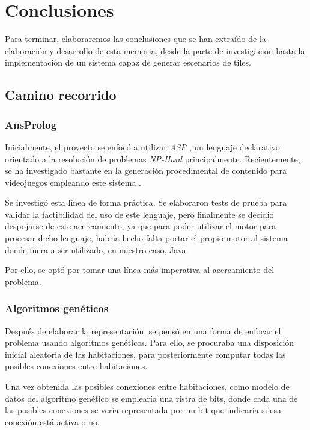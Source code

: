 \chapter{Conclusiones}\label{cap:capitulo9}

Para terminar, elaboraremos las conclusiones que se han extraído de la elaboración y desarrollo de esta memoria, desde la parte de investigación hasta la implementación de un sistema capaz de generar escenarios de tiles.

\section{Camino recorrido}

\subsection{AnsProlog}

Inicialmente, el proyecto se enfocó a utilizar \emph{ASP} \cite{ansprolog}, un lenguaje declarativo orientado a la resolución de problemas \emph{NP-Hard} \cite{nphard} principalmente. Recientemente, se ha investigado bastante en la generación procedimental de contenido para videojuegos empleando este sistema \cite{pcgbookchap8}.

Se investigó esta línea de forma práctica. Se elaboraron tests de prueba \cite{ghcspalesegdia} para validar la factibilidad del uso de este lenguaje, pero finalmente se decidió despojarse de este acercamiento, ya que para poder utilizar el motor para procesar dicho lenguaje, habría hecho falta portar el propio motor al sistema donde fuera a ser utilizado, en nuestro caso, Java.

Por ello, se optó por tomar una línea más imperativa al acercamiento del problema.

\subsection{Algoritmos genéticos}

Después de elaborar la representación, se pensó en una forma de enfocar el problema usando algoritmos genéticos. Para ello, se procuraba una disposición inicial aleatoria de las habitaciones, para posteriormente computar todas las posibles conexiones entre habitaciones.

Una vez obtenida las posibles conexiones entre habitaciones, como modelo de datos del algoritmo genético se emplearía una ristra de bits, donde cada una de las posibles conexiones se vería representada por un bit que indicaría si esa conexión está activa o no.

